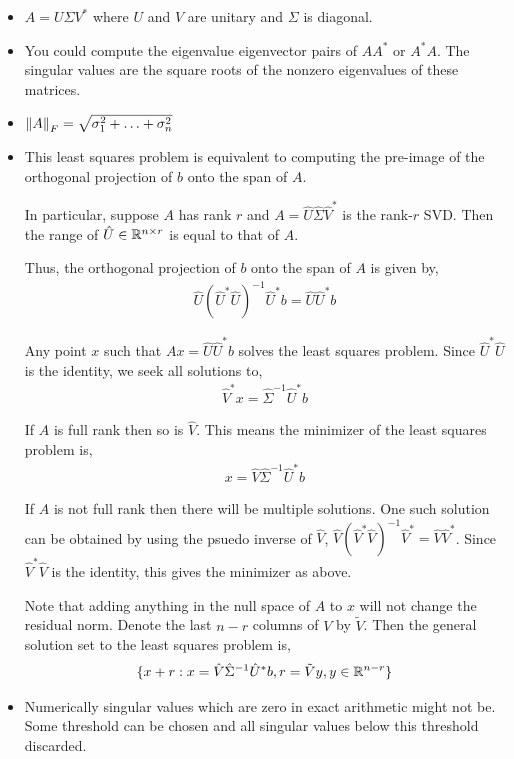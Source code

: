 \documentclass[10pt]{article}
\begin{document}
\begin{solution}[Solution]
\begin{itemize}[]
    \item \( A = U\Sigma V^* \) where \( U \) and \( V \) are unitary and \( \Sigma \) is diagonal.
    \item You could compute the eigenvalue eigenvector pairs of \( AA^* \) or \( A^*A \). The singular values are the square roots of the nonzero eigenvalues of these matrices.
    \item \( \left\lVert A\right\rVert_F = \sqrt{\sigma_1^2 + \ldots + \sigma_n^2} \)
    \item

    This least squares problem is equivalent to computing the pre-image of the orthogonal projection of \( b \) onto the span of \( A \).

    In particular, suppose \( A \) has rank \( r \) and \( A = \hat{U}\hat{\Sigma}\hat{V}^* \) is the rank-\( r \) SVD. Then the range of \( \hat{U} \in \mathbb{R}^{n\times r} \) is equal to that of \( A \).

    Thus, the orthogonal projection of \( b \) onto the span of \( A \) is given by,
    \begin{align*}
        \hat{U}(\hat{U}^*\hat{U})^{-1}\hat{U}^*b = \hat{U}\hat{U}^*b
    \end{align*}

    Any point \( x \) such that \( Ax = \hat{U}\hat{U}^*b \) solves the least squares problem. Since \( \hat{U}^*\hat{U} \) is the identity, we seek all solutions to,
    \begin{align*}
        \hat{V}^* x = \hat{\Sigma}^{-1}\hat{U}^*b
    \end{align*}

    If \( A \) is full rank then so is \( \hat{V} \). This means the minimizer  of the least squares problem is,
    \begin{align*}
        x = \hat{V} \hat{\Sigma}^{-1} \hat{U}^* b
    \end{align*}

    If \( A \) is not full rank then there will be multiple solutions. One such solution can be obtained by using the psuedo inverse of \( \hat{V} \), \( \hat{V}(\hat{V}^*\hat{V})^{-1}\hat{V}^* = \hat{V}\hat{V}^* \). Since \( \hat{V}^*\hat{V} \) is the identity, this gives the  minimizer as above.

    Note that adding anything in the null space of \( A \) to \( x \) will not change the residual norm. Denote the last \( n-r \) columns of \( V \) by \( \tilde{V} \). Then the general solution set to the least squares problem is,
    \begin{align*}
        \{ x + r : x = \hat{V} \hat{\Sigma}^{-1} \hat{U}^* b, r = \tilde{V}y, y\in\mathbb{R}^{n-r} \}
    \end{align*}

    \item Numerically singular values which are zero in exact arithmetic might not be. Some threshold can be chosen and all singular values below this threshold discarded.


\end{itemize}
\end{solution}
\end{document}
